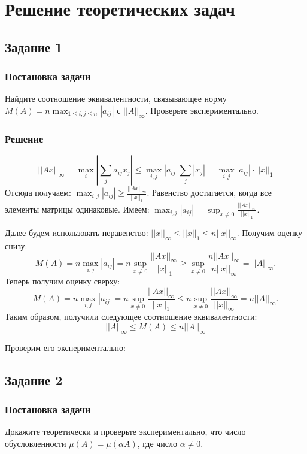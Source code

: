 \section{Решение теоретических задач}
    \subsection{Задание 1}
        \subsubsection{Постановка задачи}
            Найдите соотношение эквивалентности, связывающее норму\\ $M(A) = n \max_{1 \leq i,j \leq n}{|a_{ij}|}$ с $ || A ||_\infty $. Проверьте экспериментально.
    
        \subsubsection{Решение}
            \[
                ||Ax||_\infty = \max_i \left| \sum_{j} a_{ij} x_j \right| \leq \max_{i,j}| a_{ij} | \sum_{j} |x_j| = \max_{i,j} |a_{ij}| \cdot ||x||_1
            \]
            Отсюда получаем: $ \max_{i,j} |a_{ij}| \geq \frac{||Ax||_\infty}{||x||_1} $. Равенство достигается, когда все элементы матрицы одинаковые. Имеем: $ \max_{i,j} |a_{ij}| = \sup_{x \neq 0} \frac{||Ax||_\infty}{||x||_1} $.

            Далее будем использовать неравенство: $ ||x||_\infty \leq ||x||_1 \leq n ||x||_\infty $. Получим оценку снизу:
            \[
                M(A) = n \max_{i,j}{|a_{ij}|} = n \sup_{x \neq 0} \frac{||Ax||_\infty}{||x||_1} \geq \sup_{x \neq 0} \frac{n||Ax||_\infty}{n||x||_\infty} = ||A||_\infty.
            \]
            Теперь получим оценку сверху:
            \[
                M(A) = n \max_{i,j}{|a_{ij}|} = n \sup_{x \neq 0} \frac{||Ax||_\infty}{||x||_1} \leq n \sup_{x \neq 0} \frac{||Ax||_\infty}{||x||_\infty} = n||A||_\infty.
            \]
            Таким образом, получили следующее соотношение эквивалентности:
            $$ ||A||_\infty \leq M(A) \leq n||A||_\infty $$ 

            Проверим его экспериментально:


    
    \subsection{Задание 2}
        \subsubsection{Постановка задачи}
            Докажите теоретически и проверьте экспериментально, что число обусловленности $ \mu(A) = \mu(\alpha A) $, где число $ \alpha \neq 0 $.
        
